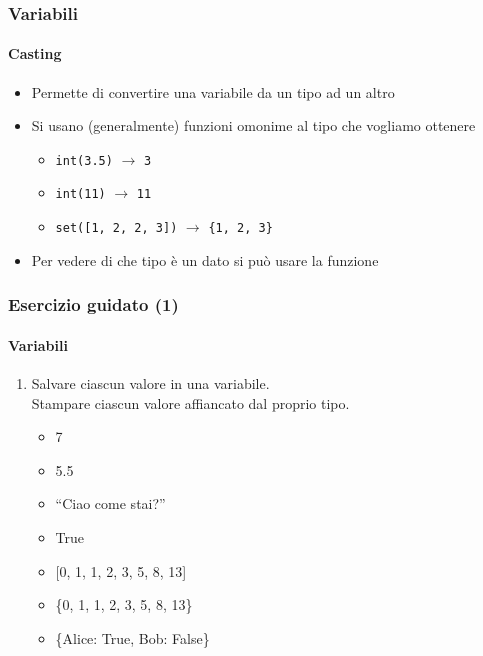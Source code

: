 \begin{contentframe}
    \frametitle{Variabili}
    \framesubtitle{Casting}

    \begin{itemize}
        \item Permette di convertire una variabile da un tipo ad un altro

        \bigskip
        \item Si usano (generalmente) funzioni omonime al tipo che vogliamo ottenere
        \begin{itemize}
            \item \texttt{int(3.5)} $\rightarrow$ \texttt{3}
            \item \texttt{int(\textquotesingle{}11\textquotesingle{})} $\rightarrow$ \texttt{11}
            \item \texttt{set([1, 2, 2, 3])} $\rightarrow$ \texttt{\{1, 2, 3\}}
        \end{itemize}

        \bigskip
        \item Per vedere di che tipo è un dato si può usare la funzione 
        
    \end{itemize}
\end{contentframe}


\begin{exerciseframe}
    \frametitle{Esercizio guidato (1)}
    \framesubtitle{Variabili}

    \begin{enumerate}
        \item Salvare ciascun valore in una variabile.\\
    Stampare ciascun valore affiancato dal proprio tipo.
        \begin{itemize}
            \item 7\pause
            \item 5.5\pause
            \item ``Ciao come stai?''\pause
            \item True\pause
            \item{} [0, 1, 1, 2, 3, 5, 8, 13]\pause
            \item \{0, 1, 1, 2, 3, 5, 8, 13\}\pause
            \item  \{\textquotesingle{}Alice\textquotesingle{}: True, \textquotesingle{}Bob\textquotesingle{}: False\}
        \end{itemize}
    \end{enumerate}
\end{exerciseframe}

